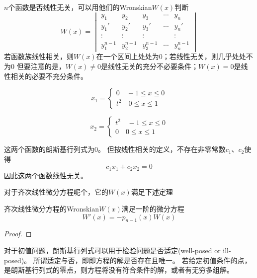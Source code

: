 $n$个函数是否线性无关，可以用他们的Wronskian$W(x)$判断
\[W(x)=
\begin{vmatrix}
    y_1& y_2 & y_3 &  \cdots & y_n \\
    y_1'& y_2' & y_3' &  \cdots & y_n' \\
    
  \vdots & \vdots & \vdots &  & \vdots  \\
    y_1^{n-1}& y_2^{n-1} & y_3^{n-1} & \cdots & y_n^{n-1} 
  \end{vmatrix}
  \]
若函数族线性相关，则$W(x)$在一个区间上处处为0；若线性无关，则几乎处处不为0
但要注意的是，$W(x)\neq 0$是线性无关的充分不必要条件；$W(x)=0$是线性相关的必要不充分条件。
\begin{example}

    \begin{equation}
        x_1=\left\{
            \begin{aligned}
                0\quad -1\leq x\leq 0\\
                t^2 \quad 0\leq x\leq 1
            \end{aligned}
            \right .
    \end{equation}

    \begin{equation}
        x_2=\left\{
            \begin{aligned}
                t^2 \quad -1\leq x\leq 0\\
                0 \quad 0\leq x\leq 1
            \end{aligned}
            \right .
    \end{equation}

    这两个函数的朗斯基行列式为0。
    但按线性相关的定义，不存在非零常数$c_1$、$c_2$使得\[c_1x_1+c_2x_2=0\]因此这两个函数线性无关。
\end{example}

对于齐次线性微分方程呢个，它的$W(x)$满足下述定理
\begin{theorem}
    齐次线性微分方程的Wronskian$W(x)$满足一阶的微分方程
    \[W'(x)=-p_{n-1}(x)W(x)\]
\end{theorem}
\begin{proof}
    
\end{proof}

对于初值问题，朗斯基行列式可以用于检验问题是否适定(well-posed or ill-posed)。
所谓适定与否，即即方程的解是否存在且唯一。
若给定初值条件的点，是朗斯基行列式的零点，则方程将没有符合条件的解，或者有无穷多组解。


